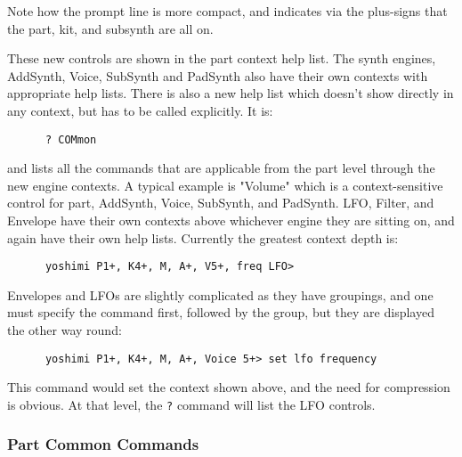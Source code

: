    Note how the prompt line is more compact, and indicates via the
   plus-signs that the part, kit, and subsynth are all on.

   These new controls are shown in the part context help list.
   The synth engines, AddSynth, Voice, SubSynth and PadSynth also have their
   own contexts with appropriate help lists.
   There is also a new help list which doesn't show directly in any context,
   but has to be called explicitly.
   It is:

   \begin{verbatim}
      ? COMmon
   \end{verbatim}

   and lists all the commands that are
   applicable from the part level through the new engine contexts.
   A typical example is "Volume" which is a context-sensitive control for part,
   AddSynth, Voice, SubSynth, and PadSynth.
   LFO, Filter, and Envelope have their own contexts above
   whichever engine they are sitting on, and again have their own help lists.
   Currently the greatest context depth is:

   \begin{verbatim}
      yoshimi P1+, K4+, M, A+, V5+, freq LFO>
   \end{verbatim}

   Envelopes and LFOs are slightly complicated as they have groupings, and one
   must specify the command first, followed by the group, but they are
   displayed the other way round:

   \begin{verbatim}
      yoshimi P1+, K4+, M, A+, Voice 5+> set lfo frequency
   \end{verbatim}

   This command would set the context shown above, and the need for
   compression is obvious.
   At that level, the \texttt{?} command will list the LFO controls.

\subsubsection{Part Common Commands}
\label{subsec:command_line_part_common_commands}


